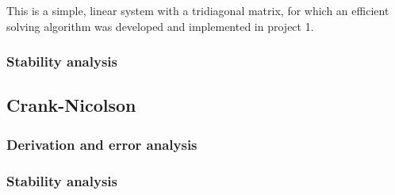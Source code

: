 \documentclass[12pt,english,a4paper]{article}
\begin{document}
This is a simple, linear system with a tridiagonal matrix, for which an efficient solving algorithm was developed and implemented in project 1\cite{oblig1}.


\subsubsection{Stability analysis}



%
\subsection{Crank-Nicolson} \label{sec:crankNicolson}

\subsubsection{Derivation and error analysis}

\subsubsection{Stability analysis}




\clearpage
{}
\printbibliography
\end{document}
